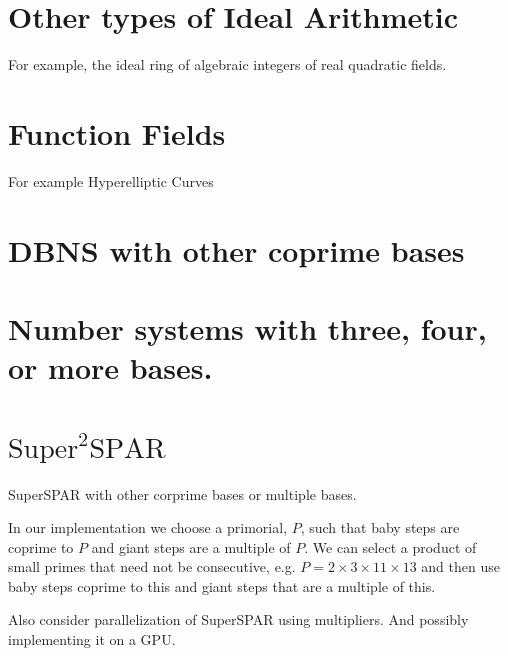 \documentclass{ucalgthes1}
\theoremstyle{plain}
\theoremstyle{definition}
\begin{document}
\section{Other types of Ideal Arithmetic}
For example, the ideal ring of algebraic integers of real quadratic fields.

\section{Function Fields}

For example Hyperelliptic Curves

\section{DBNS with other coprime bases}

\section{Number systems with three, four, or more bases.}

\section{$\textrm{Super}^2\textrm{SPAR}$}

SuperSPAR with other corprime bases or multiple bases.

In our implementation we choose a primorial, $P$, such that baby steps are coprime to $P$ and giant steps are a multiple of $P$.  We can select a product of small primes that need not be consecutive, e.g. $P = 2 \times 3 \times 11 \times 13$ and then use baby steps coprime to this and giant steps that are a multiple of this.

Also consider parallelization of SuperSPAR using multipliers.  And possibly implementing it on a GPU.




\end{document}
